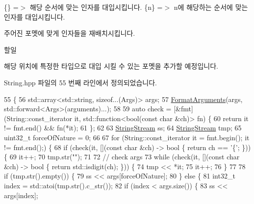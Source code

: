 \{\} =$>$ 해당 순서에 맞는 인자를 대입시킵니다. \{n\} =$>$ n에 해당하는 순서에 맞는 인자를 대입시킵니다. 

주어진 포멧에 맞게 인자들을 재배치시킵니다. \begin{DoxyRefDesc}{할일}
\item[\hyperlink{todo__todo000001}{할일}]해당 위치에 특정한 타입으로 대입 시킬 수 있는 포멧을 추가할 예정입니다. \end{DoxyRefDesc}


String.\+hpp 파일의 55 번째 라인에서 정의되었습니다.


\begin{DoxyCode}
55                                                                     \{
56             std::array<std::string, \textcolor{keyword}{sizeof}...(Args)> args;
57             \hyperlink{classcpf_1_1_string_util_af6a0483e9f189a49f9f25a6ca74d94a2}{FormatArguments}(args, std::forward<Args>(arguments)...);
58 
59             \textcolor{keyword}{auto} check = [&fmt](String::const\_iterator it, std::function<bool(const char &ch)> fn) \{
60                 \textcolor{keywordflow}{return} it != fmt.end() && fn(*it);
61             \};
62 
63             \hyperlink{namespacecpf_a6e5583a51165e808f1a480563a2d98b2}{StringStream} ss;
64             \hyperlink{namespacecpf_a6e5583a51165e808f1a480563a2d98b2}{StringStream} tmp;
65             uint32\_t forceOfNature = 0;
66 
67             \textcolor{keywordflow}{for} (String::const\_iterator it = fmt.begin(); it != fmt.end();) \{
68                 \textcolor{keywordflow}{if} (check(it, [](\textcolor{keyword}{const} \textcolor{keywordtype}{char} &ch) -> \textcolor{keywordtype}{bool} \{ \textcolor{keywordflow}{return} ch == \textcolor{charliteral}{'\{'}; \})) \{
69                     it++;
70                     tmp.str(\textcolor{stringliteral}{""});
71 
72                     \textcolor{comment}{// check args}
73                     \textcolor{keywordflow}{while} (check(it, [](\textcolor{keyword}{const} \textcolor{keywordtype}{char} &ch) -> \textcolor{keywordtype}{bool} \{ \textcolor{keywordflow}{return} std::isdigit(ch); \})) \{
74                         tmp << *it;
75                         it++;
76                     \}
77 
78                     \textcolor{keywordflow}{if} (tmp.str().empty()) \{
79                         ss << args[forceOfNature];
80                     \} \textcolor{keywordflow}{else} \{
81                         int32\_t index = std::atoi(tmp.str().c\_str());
82                         \textcolor{keywordflow}{if} (index < args.size()) \{
83                             ss << args[index];

\end{DoxyCode}
